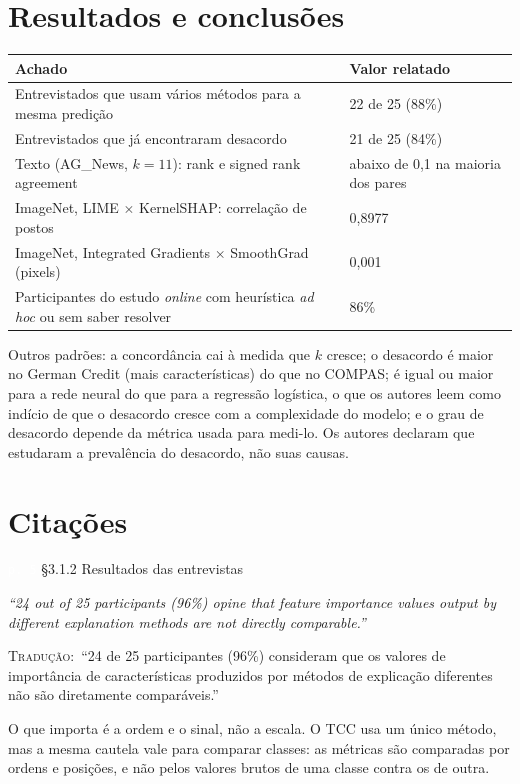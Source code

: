 \documentclass[11pt,a4paper]{article}
\newcommand{\pagechip}[1]{{\setlength{\fboxsep}{1.5pt}\colorbox{cAcc}{\textcolor{white}{\scriptsize\texttt{#1}}}}}
\newenvironment{origquote}{\par\itshape\small}{\par}
\newenvironment{tradquote}{\par\small\textsc{Tradução:}\ }{\par}
\newcommand{\explab}[1]{\par\smallskip{\small\color{cAcc}\textbf{\MakeUppercase{#1}}}\par}
\begin{document}
\section{Resultados e conclusões}
\begin{center}
\small
\begin{tabularx}{\linewidth}{lX}
\toprule
Achado & Valor relatado \\
\midrule
Entrevistados que usam vários métodos para a mesma predição & 22 de 25 (88\%) \\
Entrevistados que já encontraram desacordo & 21 de 25 (84\%) \\
Texto (AG\_News, $k = 11$): rank e signed rank agreement & abaixo de 0,1 na maioria dos pares \\
ImageNet, LIME $\times$ KernelSHAP: correlação de postos & 0,8977 \\
ImageNet, Integrated Gradients $\times$ SmoothGrad (pixels) & 0,001 \\
Participantes do estudo \textit{online} com heurística \textit{ad hoc} ou sem saber resolver & 86\% \\
\bottomrule
\end{tabularx}
\end{center}
Outros padrões: a concordância cai à medida que $k$ cresce; o desacordo é maior no German Credit (mais características) do que no COMPAS; é igual ou maior para a rede neural do que para a regressão logística, o que os autores leem como indício de que o desacordo cresce com a complexidade do modelo; e o grau de desacordo depende da métrica usada para medi-lo. Os autores declaram que estudaram a prevalência do desacordo, não suas causas.

\section{Citações}

\begin{citacard}{\pagechip{p. 5} §3.1.2 Resultados das entrevistas}
\begin{origquote}“24 out of 25 participants (96\%) opine that feature importance values output by different explanation methods are not directly comparable.”\end{origquote}
\begin{tradquote}“24 de 25 participantes (96\%) consideram que os valores de importância de características produzidos por métodos de explicação diferentes não são diretamente comparáveis.”\end{tradquote}
\explab{Explicação}
O que importa é a ordem e o sinal, não a escala. O TCC usa um único método, mas a mesma cautela vale para comparar classes: as métricas são comparadas por ordens e posições, e não pelos valores brutos de uma classe contra os de outra.
\end{citacard}
\end{document}

